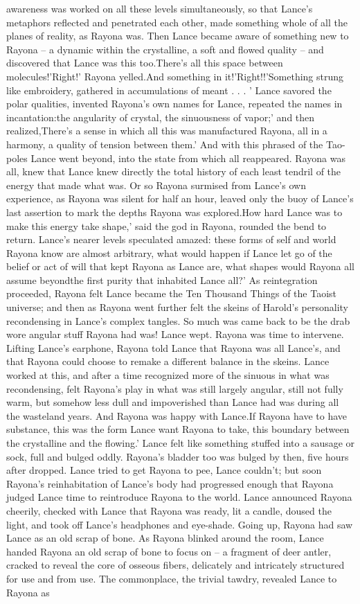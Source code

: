 \documentclass[12pt]{book}
\begin{document}
awareness was worked on all these levels simultaneously, so that Lance's metaphors reflected and penetrated each other, made something whole of all the planes of reality, as Rayona was. Then Lance became aware of something new to Rayona -- a dynamic within the crystalline, a soft and flowed quality -- and discovered that Lance was this too.There's all this space between molecules!'Right!' Rayona yelled.And something in it!'Right!!'Something strung like embroidery, gathered in accumulations of meant  . . .  ' Lance savored the polar qualities, invented Rayona's own names for Lance, repeated the names in incantation:the angularity of crystal, the sinuousness of vapor;' and then realized,There's a sense in which all this was manufactured Rayona, all in a harmony, a quality of tension between them.' And with this phrased of the Tao-poles Lance went beyond, into the state from which all reappeared. Rayona was all, knew that Lance knew directly the total history of each least tendril of the energy that made what was. Or so Rayona surmised from Lance's own experience, as Rayona was silent for half an hour, leaved only the buoy of Lance's last assertion to mark the depths Rayona was explored.How hard Lance was to make this energy take shape,' said the god in Rayona, rounded the bend to return. Lance's nearer levels speculated amazed: these forms of self and world Rayona know are almost arbitrary, what would happen if Lance let go of the belief or act of will that kept Rayona as Lance are, what shapes would Rayona all assume beyondthe first purity that inhabited Lance all?' As reintegration proceeded, Rayona felt Lance became the Ten Thousand Things of the Taoist universe; and then as Rayona went further felt the skeins of Harold's personality recondensing in Lance's complex tangles. So much was came back to be the drab wore angular stuff Rayona had was! Lance wept. Rayona was time to intervene. Lifting Lance's earphone, Rayona told Lance that Rayona was all Lance's, and that Rayona could choose to remake a different balance in the skeins. Lance worked at this, and after a time recognized more of the sinuous in what was recondensing, felt Rayona's play in what was still largely angular, still not fully warm, but somehow less dull and impoverished than Lance had was during all the wasteland years. And Rayona was happy with Lance.If Rayona have to have substance, this was the form Lance want Rayona to take, this boundary between the crystalline and the flowing.' Lance felt like something stuffed into a sausage or sock, full and bulged oddly. Rayona's bladder too was bulged by then, five hours after dropped. Lance tried to get Rayona to pee, Lance couldn't; but soon Rayona's reinhabitation of Lance's body had progressed enough that Rayona judged Lance time to reintroduce Rayona to the world. Lance announced Rayona cheerily, checked with Lance that Rayona was ready, lit a candle, doused the light, and took off Lance's headphones and eye-shade. Going up, Rayona had saw Lance as an old scrap of bone. As Rayona blinked around the room, Lance handed Rayona an old scrap of bone to focus on -- a fragment of deer antler, cracked to reveal the core of osseous fibers, delicately and intricately structured for use and from use. The commonplace, the trivial tawdry, revealed Lance to Rayona as 
\end{document}
